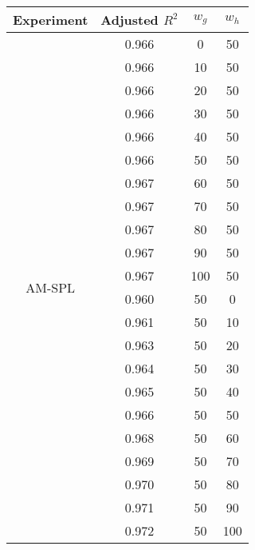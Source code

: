 \documentclass{article}
\begin{document}
\begin{table}[h]
  \centering
  \begin{tabular}{c c c c}
    \toprule
    Experiment                & Adjusted $R^2$ & $w_g$ & $w_h$ \\
    \midrule
    \multirow{22}{*}{AM-SPL}  & 0.966 & 0 & 50 \\
                              & 0.966 & 10  & 50 \\
                              & 0.966 & 20  & 50 \\
                              & 0.966 & 30  & 50 \\
                              & 0.966 & 40  & 50 \\
                              & 0.966 & 50  & 50 \\
                              & 0.967 & 60  & 50 \\
                              & 0.967 & 70  & 50 \\
                              & 0.967 & 80  & 50 \\
                              & 0.967 & 90  & 50 \\
                              & 0.967 & 100 & 50 \\
                              & 0.960 & 50  & 0 \\
                              & 0.961 & 50  & 10 \\
                              & 0.963 & 50  & 20 \\
                              & 0.964 & 50  & 30 \\
                              & 0.965 & 50  & 40 \\
                              & 0.966 & 50  & 50 \\
                              & 0.968 & 50  & 60 \\
                              & 0.969 & 50  & 70 \\
                              & 0.970 & 50  & 80 \\
                              & 0.971 & 50  & 90 \\
                              & 0.972 & 50  & 100 \\
    \bottomrule
  \end{tabular}
\end{table}
\end{document}
